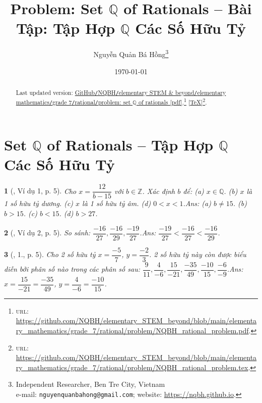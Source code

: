 \documentclass{article}
\title{Problem: Set $\mathbb{Q}$ of Rationals -- Bài Tập: Tập Hợp $\mathbb{Q}$ Các Số Hữu Tỷ}
\author{Nguyễn Quản Bá Hồng\footnote{Independent Researcher, Ben Tre City, Vietnam\\e-mail: \texttt{nguyenquanbahong@gmail.com}; website: \url{https://nqbh.github.io}.}}
\date{\today}
\newtheorem{baitoan}{}
\begin{document}
\maketitle
\begin{abstract}
	Last updated version: \href{https://github.com/NQBH/elementary_STEM_beyond/blob/main/elementary_mathematics/grade_7/rational/problem/NQBH_rational_problem.pdf}{GitHub{\tt/}NQBH{\tt/}elementary STEM \& beyond{\tt/}elementary mathematics{\tt/}grade 7{\tt/}rational{\tt/}problem: set $\mathbb{Q}$ of rationals [pdf]}.\footnote{\textsc{url}: \url{https://github.com/NQBH/elementary_STEM_beyond/blob/main/elementary_mathematics/grade_7/rational/problem/NQBH_rational_problem.pdf}.} [\href{https://github.com/NQBH/elementary_STEM_beyond/blob/main/elementary_mathematics/grade_7/rational/problem/NQBH_rational_problem.tex}{\TeX}]\footnote{\textsc{url}: \url{https://github.com/NQBH/elementary_STEM_beyond/blob/main/elementary_mathematics/grade_7/rational/problem/NQBH_rational_problem.tex}.}. 
\end{abstract}
\tableofcontents


\section{Set $\mathbb{Q}$ of Rationals -- Tập Hợp $\mathbb{Q}$ Các Số Hữu Tỷ}

\begin{baitoan}[\cite{Tuyen_Toan_7}, Ví dụ 1, p. 5]
	Cho $x = \dfrac{12}{b - 15}$ với $b\in\mathbb{Z}$. Xác định $b$ để: (a) $x\in\mathbb{Q}$. (b) $x$ là 1 số hữu tỷ dương. (c) $x$ là 1 số hữu tỷ âm. (d) $0 < x < 1$.\hfill{\sf Ans: (a) $b\ne 15$. (b) $b > 15$. (c) $b < 15$. (d) $b > 27$.}
\end{baitoan}

\begin{baitoan}[\cite{Tuyen_Toan_7}, Ví dụ 2, p. 5]
	So sánh: $\dfrac{-16}{27},\dfrac{-16}{29},\dfrac{-19}{27}$.\hfill{\sf Ans: $\dfrac{-19}{27} < \dfrac{-16}{27} < \dfrac{-16}{29}$.}
\end{baitoan}

\begin{baitoan}[\cite{Tuyen_Toan_7}, 1., p. 5]
	Cho 2 số hữu tỷ $x = \dfrac{-5}{7}$, $y = \dfrac{-2}{3}$. 2 số hữu tỷ này còn được biểu diễn bởi phân số nào trong các phân số sau: $\dfrac{9}{11},\dfrac{4}{-6},\dfrac{15}{-21},\dfrac{-35}{49},\dfrac{-10}{15},\dfrac{-6}{-9}$.\hfill{\sf Ans: $x = \dfrac{15}{-21} = \dfrac{-35}{49}$, $y = \dfrac{4}{-6} = \dfrac{-10}{15}$.}
\end{baitoan}
\end{document}

